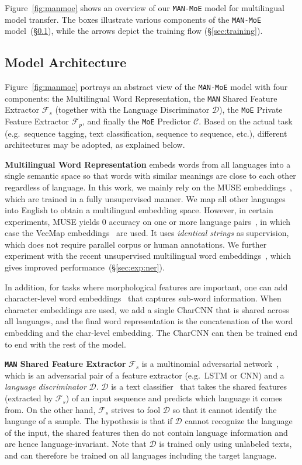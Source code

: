 \documentclass[11pt,a4paper]{article}
\newcommand{\secref}[1]{\S\ref{#1}}
\def\gC{{\mathcal{C}}}
\def\gD{{\mathcal{D}}}
\def\gF{{\mathcal{F}}}
\newcommand{\manmoe}{\texttt{MAN-MoE}}
\newcommand{\man}{\texttt{MAN}}
\newcommand{\moe}{\texttt{MoE}}
\begin{document}
Figure~\ref{fig:manmoe} shows an overview of our \manmoe{} model for multilingual model transfer.
The boxes illustrate various components of the \manmoe{} model~(\secref{sec:model_arch}), while the arrows depict the training flow (\secref{sec:training}).

\subsection{Model Architecture}\label{sec:model_arch}

Figure~\ref{fig:manmoe} portrays an abstract view of the \manmoe{} model with four components: the Multilingual Word Representation, the \man{} Shared Feature Extractor $\gF_s$ (together with the Language Discriminator $\gD$), the \moe{} Private Feature Extractor $\gF_p$, and finally the \moe{} Predictor $\gC$.
Based on the actual task (e.g.~sequence tagging, text classification, sequence to sequence, etc.), different architectures may be adopted, as explained below.

\noindent\textbf{Multilingual Word Representation}
embeds words from all languages into a single semantic space so that words with similar meanings are close to each other regardless of language.
In this work, we mainly rely on the MUSE embeddings~\citep{lample2018word}, which are trained in a fully unsupervised manner.
We map all other languages into English to obtain a multilingual embedding space.
However, in certain experiments, MUSE yields 0 accuracy on one or more language pairs~\citep{P18-1072}, in which case the VecMap embeddings~\citep{P17-1042} are used.
It uses \emph{identical strings} as supervision, which does not require parallel corpus or human annotations.
We further experiment with the recent unsupervised multilingual word embeddings~\cite{chen2018umwe}, which gives improved performance~(\secref{sec:exp:ner}).

In addition, for tasks where morphological features are important, one can add character-level word embeddings~\citep{DosSantos:2014:LCR:3044805.3045095} that captures sub-word information.
When character embeddings are used, we add a single CharCNN that is shared across all languages, and the final word representation is the concatenation of the word embedding and the char-level embedding. The CharCNN can then be trained end to end with the rest of the model.

\noindent\textbf{\man{} Shared Feature Extractor}
$\gF_s$ is a multinomial adversarial network~\citep{N18-1111}, which is an adversarial pair of a feature extractor (e.g.~LSTM or CNN) and a \emph{language discriminator} $\gD$.
$\gD$ is a text classifier~\citep{D14-1181} that takes the shared features (extracted by $\gF_s$) of an input sequence and predicts which language it comes from.
On the other hand, $\gF_s$ strives to fool $\gD$ so that it cannot identify the language of a sample.
The hypothesis is that if $\gD$ cannot recognize the language of the input, the shared features then do not contain language information and are hence language-invariant.
Note that $\gD$ is trained only using unlabeled texts, and can therefore be trained on all languages including the target language.
\end{document}
